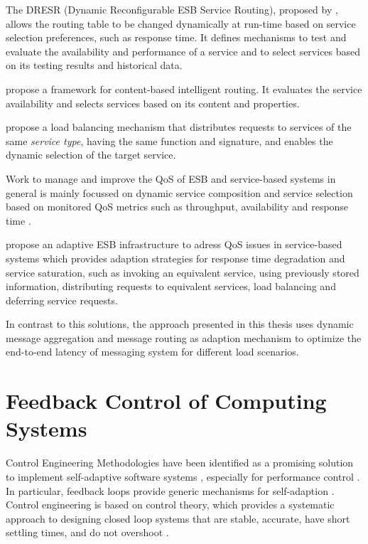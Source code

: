 The DRESR (Dynamic Reconfigurable ESB Service Routing), proposed by \cite{Bai:2007aa}, allows the routing table to be changed dynamically at run-time based on service selection preferences, such as response time. It defines mechanisms to test and evaluate the availability and performance of a service and to select services based on its testing results and historical data.

\cite{Ziyaeva:2008aa} propose a framework for content-based intelligent routing. It evaluates the service availability and selects services based on its content and properties.

\cite{Jongtaveesataporn:2010aa} propose a load balancing me\-chanism that distributes requests to services of the same \emph{service type}, having the same function and signature, and enables the dynamic selection of the target service.

Work to manage and improve the \ac{QoS} of \ac{ESB} and service-based systems in general is mainly focussed on dynamic service composition and service selection based on monitored QoS metrics such as throughput, availability and response time \citep{Calinescu:2011aa}. 

\cite{Gonzalez:2011} propose an adaptive \ac{ESB} infrastructure to adress \ac{QoS} issues in service-based systems which provides adaption strategies for response time degradation and service saturation, such as invoking an equivalent service, using previously stored information, distributing requests to equivalent services, load balancing and deferring service requests.

In contrast to this solutions, the approach presented in this thesis uses dynamic message aggregation and message routing as adaption mechanism to optimize the end-to-end latency of messaging system for different load scenarios.

\section{Feedback Control of Computing Systems}

Control Engineering Methodologies have been identified as a promising solution to implement self-adaptive software systems \citep{Patikirikorala:2012ky}, especially for performance control \citep{Abdelzaher:2003ea}. In particular, feedback loops provide generic mechanisms for self-adaption \citep{Brun:2009ww}.  Control engineering is based on control theory, which provides a systematic approach to designing closed loop systems that are stable, accurate, have short settling times, and do not overshoot \citep{Abdelzaher:2008ub}.

